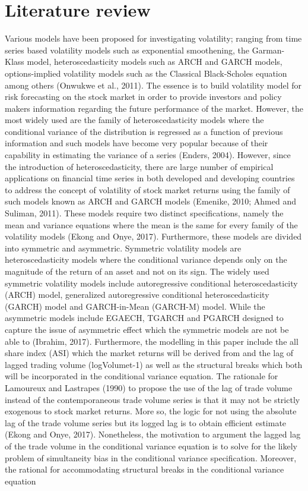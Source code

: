 \documentclass[twoside,a4paper,12pt]{article}
\begin{document}
\section*{Literature review}Various models have been proposed for investigating volatility; ranging from time series based volatility models such as exponential smoothening, the Garman-Klass model, heteroscedasticity models  such  as  ARCH  and  GARCH  models,  options-implied  volatility  models  such  as  the Classical Black-Scholes equation among others (Onwukwe et al., 2011). The  essence  is  to  build volatility model for risk forecasting on the stock market in order to provide investors and policy makers information regarding the future performance of the market. However, the most widely used  are  the  family  of  heteroscedasticity  models  where  the  conditional  variance  of  the distribution is regressed  as  a function  of  previous information and  such  models have  become very  popular  because  of  their  capability  in  estimating  the  variance  of  a series (Enders,  2004). However,  since  the  introduction  of  heteroscedasticity,  there  are  large  number  of  empirical applications on financial time series in both developed and developing countries to address the concept of  volatility of stock market returns using the family of such models known as ARCH and  GARCH  models  (Emenike,  2010; Ahmed  and  Suliman,  2011).  These  models  require  two distinct specifications, namely the mean and variance equations where the mean is the same for every family  of the  volatility models  (Ekong  and  Onye,  2017).  Furthermore,  these  models  are divided  into  symmetric  and  asymmetric.  Symmetric  volatility  models  are  heteroscedasticity models where the conditional variance depends only on the magnitude of the return of an asset and  not  on  its  sign.  The  widely  used  symmetric  volatility  models  include  autoregressive conditional  heteroscedasticity  (ARCH)  model,  generalized  autoregressive  conditional heteroscedasticity   (GARCH)  model  and  GARCH-in-Mean  (GARCH-M)  model.  While  the asymmetric models include EGAECH, TGARCH and PGARCH designed to capture the issue of asymmetric effect which the symmetric models are not be able to (Ibrahim, 2017). Furthermore,  the  modelling  in  this  paper  include  the  all share index  (ASI)  which  the  market returns will be derived from and the lag of lagged trading volume (logVolumet-1) as well as the structural  breaks  which  both  will  be  incorporated  in  the  conditional  variance  equation.  The rationale  for  Lamoureux and  Lastrapes  (1990)  to  propose  the use  of  the  lag  of  trade  volume instead of  the contemporaneous trade volume series is that it  may not be strictly exogenous to stock market returns. More so, the logic for not using the absolute lag of the trade volume series but  its  logged  lag  is  to  obtain  efficient  estimate  (Ekong  and  Onye,  2017).  Nonetheless,  the motivation to argument the lagged lag of the trade volume in the conditional variance equation is to solve for the likely problem of simultaneity bias in the conditional variance specification. Moreover, the rational for accommodating structural breaks in the conditional variance equation 
\end{document}
